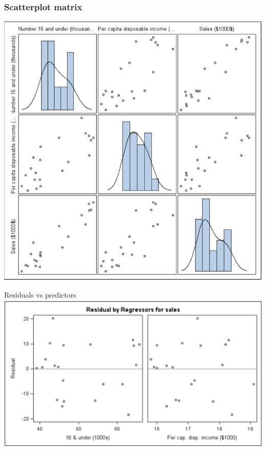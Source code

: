 \documentclass{beamer}
\begin{document}
\begin{frame}[fragile]
\frametitle{Scatterplot matrix}

\centerline{\includegraphics[scale=0.25]{plots/scat-matrix}}
\end{frame}

\begin{frame}{Residuals vs predictors}
\centering\includegraphics[scale=0.25]{plots/res-x}
\end{frame}
\end{document}
